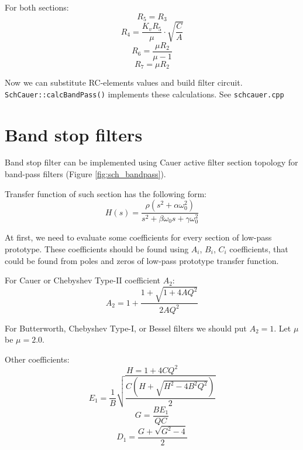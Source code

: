 For both sections:
\begin{equation}
 R_5=R_3
\end{equation}
\begin{equation}
 R_4=\frac{K_v R_5}{\mu}\cdot\sqrt{\frac{C}{A}}
\end{equation}
\begin{equation}
 R_6=\frac{\mu R_2}{\mu - 1}
\end{equation}
\begin{equation}
 R_7 = \mu R_2
\end{equation}


Now we can substitute RC-elements values and build filter circuit. 
\verb|SchCauer::calcBandPass()| implements these calculations. See 
\verb|schcauer.cpp|




\section{Band stop filters}


Band stop filter can be implemented using Cauer active filter section topology 
for band-pass filters (Figure \ref{fig:sch_bandpass}).

Transfer function of such section has the following form:
\begin{equation}
 H(s) = \frac{\rho(s^2+\alpha\omega_0^2)}{s^2+\beta\omega_0s+\gamma\omega_0^2}
\end{equation}

At first, we need to evaluate some coefficients for every section of low-pass 
prototype. These coefficients should be found using $A_i$, $B_i$, $C_i$ 
coefficients, that could be found from poles and zeros of low-pass prototype 
transfer function.

For Cauer or Chebyshev Type-II coefficient $A_2$:
\begin{equation}
 A_2 = 1+\frac{1+\sqrt{1+4AQ^2}}{2AQ^2}
\end{equation}

For Butterworth, Chebyshev Type-I, or Bessel filters we should put $A_2=1$. Let 
$\mu$ be $\mu=2.0$.

Other coefficients:
\begin{equation}
 H = 1+4CQ^2
\end{equation}
\begin{equation}
 E_1=\frac{1}{B}\sqrt{\frac{C(H+\sqrt{H^2-4B^2Q^2})}{2}}
\end{equation}
\begin{equation}
 G=\frac{BE_1}{QC}
\end{equation}
\begin{equation}
 D_1=\frac{G+\sqrt{G^2-4}}{2}
\end{equation}

